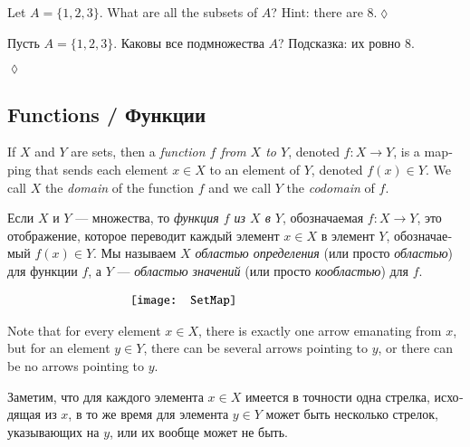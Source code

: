 \documentclass[a4paper]{book}
\def\to{\rightarrow}
\def\taking{\colon}
\theoremstyle{myth}
\newtheorem{excENG}[envENG]{\begin{english}Exercise\end{english}}
\newenvironment{exerciseENG}{\begin{excENG}}{\hspace*{\fill}$\lozenge$\end{excENG}}
\newtheorem{excRUS}[envRUS]{\begin{russian}Упражнение\end{russian}}
\newenvironment{exerciseRUS}{\begin{excRUS}}{\hspace*{\fill}$\lozenge$\end{excRUS}}
\begin{document}
\begin{english}
\begin{exerciseENG}Let $A=\{1,2,3\}$. What are all the subsets of $A$? Hint: there are 8.\end{exerciseENG}
\begin{exerciseRUS}\begin{russian}Пусть $A=\{1,2,3\}$. Каковы все подмножества $A$? Подсказка: их ровно $8$. \end{russian}\end{exerciseRUS}


\subsection{Functions / Функции}\label{sec:functions}

If $X$ and $Y$ are sets, then a {\em function $f$ from $X$ to $Y$}, denoted $f\taking X\to Y$, is a mapping that sends each element $x\in X$ to an element of $Y$, denoted $f(x)\in Y$. We call $X$ the {\em domain} of the function $f$ and we call $Y$ the {\em codomain} of $f$. 

\begin{russian}Если $X$ и $Y$ — множества, то {\em функция $f$ из $X$ в $Y$}, обозначаемая $f\taking X\to Y$, это отображение, которое переводит каждый элемент $x\in X$ в элемент $Y$, обозначаемый $f(x)\in Y$. Мы называем $X$ {\em областью определения} (или просто {\em областью}) для функции $f$, а $Y$ — {\em областью значений} (или просто {\em кообластью}) для $f$.  \end{russian}

\begin{align}\label{dia:setmap}
\parbox{2.3in}{\texttt{[image: SetMap]}}
\end{align}

Note that for every element $x\in X$, there is exactly one arrow emanating from $x$, but for an element $y\in Y$, there can be several arrows pointing to $y$, or there can be no arrows pointing to $y$. 

\begin{russian}Заметим, что для каждого элемента $x\in X$ имеется в точности одна стрелка, исходящая из $x$, в то же время для элемента $y\in Y$ может быть несколько стрелок, указывающих на $y$, или их вообще может не быть.\end{russian}


\end{english}
\end{document}

